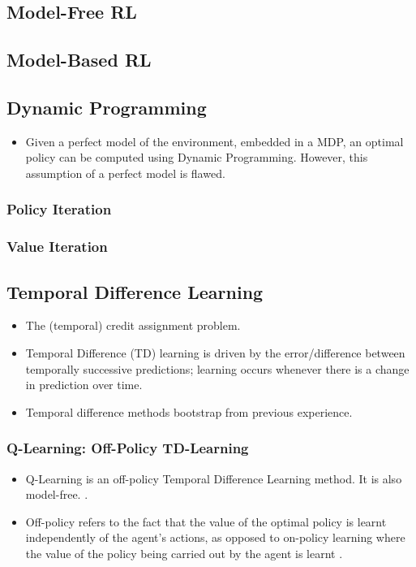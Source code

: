 \subsection{Model-Free RL}
\subsection{Model-Based RL}
\subsection{Dynamic Programming}
\begin{itemize}
\item Given a perfect model of the environment, embedded in a MDP, an optimal policy can be computed using Dynamic Programming. However, this assumption of a perfect model is flawed.
\end{itemize}
\subsubsection{Policy Iteration}
\subsubsection{Value Iteration}
\subsection{Temporal Difference Learning}
\begin{itemize}
    \item The (temporal) credit assignment problem.
    \item Temporal Difference (TD) learning is driven by the error/difference between temporally successive predictions; learning occurs whenever there is a change in prediction over time. \cite{Sutton:1988}
    \item Temporal difference methods bootstrap from previous experience.
\end{itemize}
\subsubsection{Q-Learning: Off-Policy TD-Learning}
\begin{itemize}
    \item Q-Learning is an off-policy Temporal Difference Learning method. It is also model-free. \cite{Watkins:1989, journals/ml/WatkinsD92}.
    \item Off-policy refers to the fact that the value of the optimal policy is learnt independently of the agent's actions, as opposed to on-policy learning where the value of the policy being carried out by the agent is learnt \cite{PooleMackworth17}.
\end{itemize}
